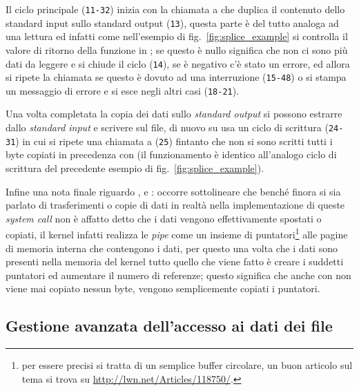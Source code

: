Il ciclo principale (\texttt{\small 11-32}) inizia con la chiamata a
 che duplica il contenuto dello standard input sullo standard output
(\texttt{\small 13}), questa parte è del tutto analoga ad una lettura ed
infatti come nell'esempio di fig.~\ref{fig:splice_example} si controlla il
valore di ritorno della funzione in ; se questo è nullo significa che
non ci sono più dati da leggere e si chiude il ciclo (\texttt{\small 14}), se
è negativo c'è stato un errore, ed allora si ripete la chiamata se questo è
dovuto ad una interruzione (\texttt{\small 15-48}) o si stampa un messaggio
di errore e si esce negli altri casi (\texttt{\small 18-21}).

Una volta completata la copia dei dati sullo \textit{standard output} si
possono estrarre dallo \textit{standard input} e scrivere sul file, di nuovo
su usa un ciclo di scrittura (\texttt{\small 24-31}) in cui si ripete una
chiamata a  (\texttt{\small 25}) fintanto che non si sono scritti
tutti i  byte copiati in precedenza con  (il funzionamento
è identico all'analogo ciclo di scrittura del precedente esempio di
fig.~\ref{fig:splice_example}).

Infine una nota finale riguardo ,  e :
occorre sottolineare che benché finora si sia parlato di trasferimenti o copie
di dati in realtà nella implementazione di queste \textit{system call} non è
affatto detto che i dati vengono effettivamente spostati o copiati, il kernel
infatti realizza le \textit{pipe} come un insieme di puntatori\footnote{per
  essere precisi si tratta di un semplice buffer circolare, un buon articolo
  sul tema si trova su \url{http://lwn.net/Articles/118750/}.}  alle pagine di
memoria interna che contengono i dati, per questo una volta che i dati sono
presenti nella memoria del kernel tutto quello che viene fatto è creare i
suddetti puntatori ed aumentare il numero di referenze; questo significa che
anche con  non viene mai copiato nessun byte, vengono semplicemente
copiati i puntatori.




\subsection{Gestione avanzata dell'accesso ai dati dei file}
\label{sec:file_fadvise}

